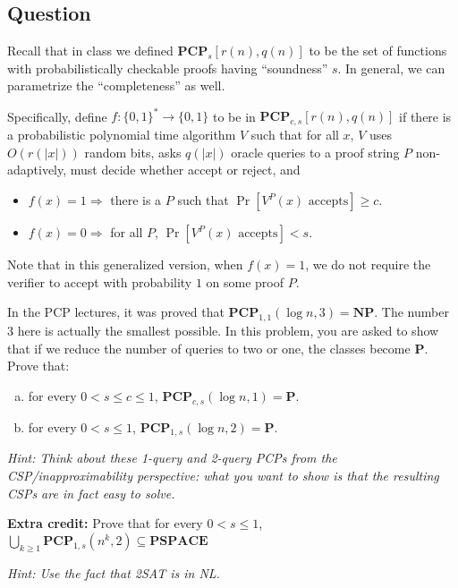 \documentclass{article}
\newcommand{\mf}[1]{\mathbf{#1}}
\begin{document}
\subsection*{Question}
Recall that in class we defined $\mf{PCP}_s[r(n),q(n)]$ to be the set of functions with probabilistically checkable proofs having ``soundness'' $s$. In general, we can parametrize the ``completeness'' as well. 

Specifically, define $f:\{0,1\}^* \rightarrow \{0,1\}$ to be in $\mf{PCP}_{c,s}[r(n),q(n)]$ if there is a probabilistic polynomial time algorithm $V$ such that for all $x$, $V$ uses $O(r(|x|))$ random bits, asks $q(|x|)$ oracle queries to a proof string $P$ non-adaptively, must decide whether accept or reject, and
\begin{itemize}
	\item
	$f(x) = 1 \Longrightarrow$ there is a $P$ such that $\Pr[V^P(x) \textrm{ accepts}] \geq c$.
	\item
	$f(x) = 0 \Longrightarrow$ for all $P$, $\Pr[V^P(x) \textrm{ accepts}] < s$.
\end{itemize}

Note that in this generalized version, when $f(x) = 1$, we do not require the verifier to accept with probability $1$ on some proof $P$. 

In the PCP lectures, it was proved that $\mf{PCP}_{1,1}(\log n, 3)=\mathbf{NP}$. The number $3$ here is actually the smallest possible. In this problem, you are asked to show that if we reduce the number of queries to two or one, the classes become $\mathbf{P}$. Prove that:
\begin{enumerate}[(a)]
	\item
	for every $0<s\leq  c\leq 1$, $\mf{PCP}_{c,s}(\log n,1)=\mathbf{P}$.
	\item
	for every $0<s\leq 1$, $\mf{PCP}_{1,s}(\log n,2)=\mathbf{P}$.
\end{enumerate} 
\emph{Hint: Think about these 1-query and 2-query PCPs from the CSP/inapproximability perspective: what you want to show is that the resulting CSPs are in fact easy to solve.}

\smallskip

{\bf Extra credit:} Prove that for every $0<s\leq 1$, $\bigcup_{k \geq 1} \mf{PCP}_{1,s}(n^k,2) \subseteq \mf{PSPACE}$

\smallskip

\emph{Hint: Use the fact that 2SAT is in NL.} 

\newpage
\end{document}
